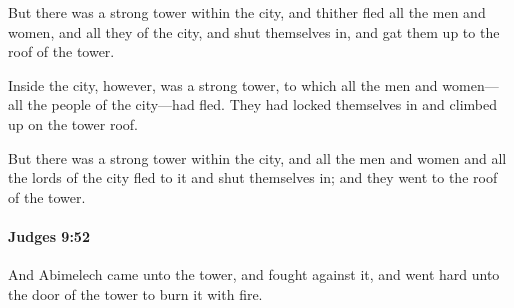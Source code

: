 			\begin{versebox}
					\item[BHS] 
					\item[ASV] But there was a strong tower within the city, and thither fled all the men and women, and all they of the city, and shut themselves in, and gat them up to the roof of the tower.
					\item[NIV] Inside the city, however, was a strong tower, to which all the men and women—all the people of the city—had fled. They had locked themselves in and climbed up on the tower roof.
					\item[NRSV] But there was a strong tower within the city, and all the men and women and all the lords of the city fled to it and shut themselves in; and they went to the roof of the tower.
			\end{versebox}

		\paragraph{Judges 9:52} %
			\label{JUDGES-9-52}

			And Abimelech came unto the tower, and fought against it, and went hard unto the door of the tower to burn it with fire.

